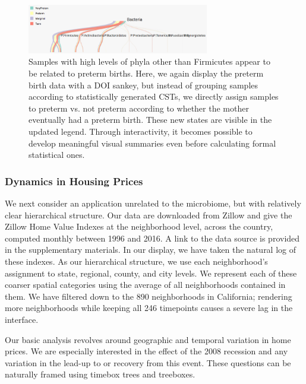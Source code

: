 \begin{figure}
\centering
\includegraphics[width=300px]{figure/treelapse/preterm_preterm}
\caption{Samples with high levels of phyla other than Firmicutes appear to be
  related to preterm births. Here, we again display the preterm birth data with
  a DOI sankey, but instead of grouping samples according to statistically
  generated CSTs, we directly assign samples to preterm vs. not preterm
  according to whether the mother eventually had a preterm birth. These new
  states are visible in the updated legend. Through interactivity, it becomes
  possible to develop meaningful visual summaries even before calculating formal
  statistical ones.}
\label{fig:pretermpreterm}
\end{figure}

\subsubsection{Dynamics in Housing Prices}\label{zillow-study}

We next consider an application unrelated to the microbiome, but with relatively
clear hierarchical structure. Our data are downloaded from Zillow and give the
Zillow Home Value Indexes at the neighborhood level, across the country,
computed monthly between 1996 and 2016. A link to the data source is provided in
the supplementary materials. In our display, we have taken the natural log of
these indexes. As our hierarchical structure, we use each neighborhood's
assignment to state, regional, county, and city levels. We represent each of
these coarser spatial categories using the average of all neighborhoods
contained in them. We have filtered down to the 890 neighborhoods in California;
rendering more neighborhoods while keeping all 246 timepoints causes a severe
lag in the interface.

Our basic analysis revolves around geographic and temporal variation in home
prices. We are especially interested in the effect of the 2008 recession and any
variation in the lead-up to or recovery from this event. These questions can be
naturally framed using timebox trees and treeboxes.

